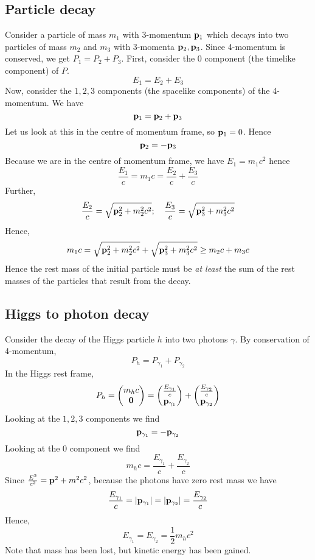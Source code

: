 \subsection{Particle decay}
Consider a particle of mass \(m_1\) with 3-momentum \(\vb p_1\) which decays into two particles of mass \(m_2\) and \(m_3\) with 3-momenta \(\vb p_2, \vb p_3\).
Since 4-momentum is conserved, we get \(P_1 = P_2 + P_3\).
First, consider the 0 component (the timelike component) of \(P\).
\[
	E_1 = E_2 + E_3
\]
Now, consider the \(1, 2, 3\) components (the spacelike components) of the 4-momentum.
We have
\[
	\vb p_1 = \vb p_2 + \vb p_3
\]
Let us look at this in the centre of momentum frame, so \(\vb p_1 = 0\).
Hence
\[
	\vb p_2 = -\vb p_3
\]
Because we are in the centre of momentum frame, we have \(E_1 = m_1 c^2\) hence
\[
	\frac{E_1}{c} = m_1 c = \frac{E_2}{c} + \frac{E_3}{c}
\]
Further,
\[
	\frac{E_2}{c} = \sqrt{\vb p_2^2 + m_2^2 c^2};\quad \frac{E_3}{c} = \sqrt{\vb p_3^2 + m_3^2 c^2}
\]
Hence,
\[
	m_1 c = \sqrt{\vb p_2^2 + m_2^2 c^2} + \sqrt{\vb p_3^2 + m_3^2 c^2} \geq m_2 c + m_3 c
\]
Hence the rest mass of the initial particle must be \textit{at least} the sum of the rest masses of the particles that result from the decay.

\subsection{Higgs to photon decay}
Consider the decay of the Higgs particle \(h\) into two photons \(\gamma\).
By conservation of 4-momentum,
\[
	P_h = P_{\gamma_1} + P_{\gamma_2}
\]
In the Higgs rest frame,
\[
	P_h = \begin{pmatrix}
		m_h c \\ \vb 0
	\end{pmatrix} =
	\begin{pmatrix}
		\frac{E_{\gamma_1}}{c} \\ \vb p_{\gamma_1}
	\end{pmatrix}
	+
	\begin{pmatrix}
		\frac{E_{\gamma_2}}{c} \\ \vb p_{\gamma_2}
	\end{pmatrix}
\]
Looking at the \(1, 2, 3\) components we find
\[
	\vb p_{\gamma_1} = -\vb p_{\gamma_2}
\]
Looking at the 0 component we find
\[
	m_h c = \frac{E_{\gamma_1}}{c} + \frac{E_{\gamma_2}}{c}
\]
Since \(\frac{E^2}{c^2} = \vb p^2 + m^2c^2\), because the photons have zero rest mass we have
\[
	\frac{E_{\gamma_1}}{c} = \abs{\vb p_{\gamma_1}} = \abs{\vb p_{\gamma_2}} = \frac{E_{\gamma_2}}{c}
\]
Hence,
\[
	E_{\gamma_1} = E_{\gamma_2} = \frac{1}{2}m_h c^2
\]
Note that mass has been lost, but kinetic energy has been gained.

